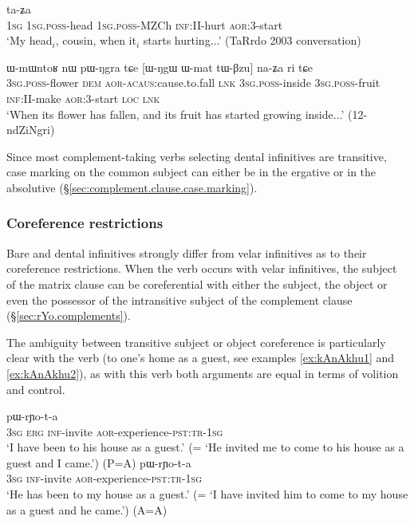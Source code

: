 \begin{exe} 
\ex \label{ex:tWmNAm.taZa}
 ta-ʑa \\
\textsc{1sg} \textsc{1sg}.\textsc{poss}-head \textsc{1sg}.\textsc{poss}-MZCh \textsc{inf}:II-hurt \textsc{aor}:3\flobv{}-start \\
\glt `My head$_i$, cousin, when it$_i$ starts hurting...' (TaRrdo 2003 conversation)
  \end{exe} 
  
\begin{exe} 
\ex \label{ex:Wmat.tWBzu.naZa}
\gll ɯ-mɯntoʁ nɯ pɯ-ŋgra tɕe [ɯ-ŋgɯ ɯ-mat tɯ-βzu] na-ʑa ri tɕe \\
\textsc{3sg}.\textsc{poss}-flower \textsc{dem} \textsc{aor}-\textsc{acaus}:cause.to.fall \textsc{lnk} \textsc{3sg}.\textsc{poss}-inside \textsc{3sg}.\textsc{poss}-fruit \textsc{inf}:II-make \textsc{aor}:3\flobv{}-start \textsc{loc} \textsc{lnk} \\
\glt `When its flower has fallen, and its fruit has started growing inside...' (12-ndZiNgri)
 \end{exe} 
 
Since most com\-ple\-ment-taking verbs selecting dental infinitives are transitive, case marking on the common subject can either be in the ergative or in the absolutive (§\ref{sec:complement.clause.case.marking}).

\subsubsection{Coreference restrictions} \label{sec:bare.inf.coreference}
Bare and dental infinitives strongly differ from velar infinitives as to their coreference restrictions. When the verb  occurs with velar infinitives, the subject of the matrix clause can be coreferential with either the subject, the object or even the possessor of the intransitive subject of the complement clause (§\ref{sec:rYo.complements}).

The ambiguity between transitive subject or object coreference is particularly clear with the verb  (to one's home as a guest, see examples \ref{ex:kAnAkhu1} and \ref{ex:kAnAkhu2}), as with this verb both arguments are equal in terms of volition and control.

\begin{exe}
\ex  \label{ex:kAnAkhu1}
 pɯ-rɲo-t-a  \\
\textsc{3sg} \textsc{erg} \textsc{inf}-invite \textsc{aor}-experience-\textsc{pst}:\textsc{tr}-\textsc{1sg} \\
\glt `I have been to his house as a guest.'  (= `He invited me to come to his house as a guest and I came.') (P=A)
\ex  \label{ex:kAnAkhu2}
 pɯ-rɲo-t-a  \\
\textsc{3sg}  \textsc{inf}-invite \textsc{aor}-experience-\textsc{pst}:\textsc{tr}-\textsc{1sg} \\
\glt `He has been to my house as a guest.' (= `I have invited him to come to my house as a guest and he came.') (A=A)
\end{exe}

